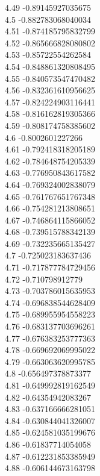 {4.49	-0.89145927035675\\
4.5	-0.882783068040034\\
4.51	-0.874185795832799\\
4.52	-0.865666828080802\\
4.53	-0.85722554262584\\
4.54	-0.848861320808495\\
4.55	-0.840573547470482\\
4.56	-0.832361610956625\\
4.57	-0.824224903116441\\
4.58	-0.816162819305366\\
4.59	-0.808174758385602\\
4.6	-0.8002601227266\\
4.61	-0.792418318205189\\
4.62	-0.784648754205339\\
4.63	-0.776950843617582\\
4.64	-0.769324002838079\\
4.65	-0.761767651767348\\
4.66	-0.754281213808651\\
4.67	-0.746864115866052\\
4.68	-0.739515788342139\\
4.69	-0.732235665135427\\
4.7	-0.725023183637436\\
4.71	-0.717877784729456\\
4.72	-0.710798912779\\
4.73	-0.703786015635953\\
4.74	-0.696838544628409\\
4.75	-0.689955954558223\\
4.76	-0.683137703696261\\
4.77	-0.676383253777363\\
4.78	-0.669692069995022\\
4.79	-0.663063620995785\\
4.8	-0.656497378873377\\
4.81	-0.649992819162549\\
4.82	-0.64354942083267\\
4.83	-0.637166666281051\\
4.84	-0.630844041326007\\
4.85	-0.624581035199676\\
4.86	-0.61837714054058\\
4.87	-0.612231853385949\\
4.88	-0.606144673163798\\
}

